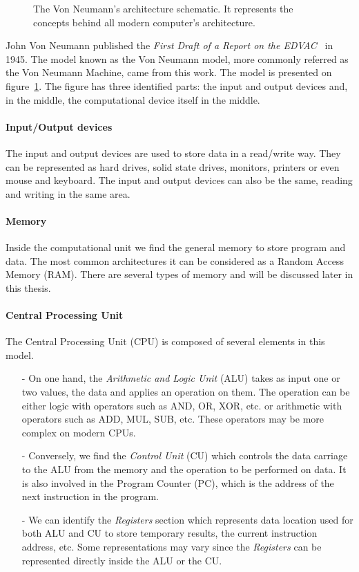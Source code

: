 \begin{figure}
\centering 

\caption[Von Neumann's architecture]{The Von Neumann's architecture schematic. It represents the concepts behind all modern computer's architecture. }
\label{fig:1_HPC:von_neumann_model}
\end{figure}

John Von Neumann published the \textit{First Draft of a Report on the EDVAC}~\cite{von1993first} in 1945. 
The model known as the Von Neumann model, more commonly referred as the Von Neumann Machine, came from this work.
The model is presented on figure~\ref{fig:1_HPC:von_neumann_model}.
The figure has three identified parts: the input and output devices and, in the middle, the computational device itself in the middle. 
\paragraph{Input/Output devices}
The input and output devices are used to store data in a read/write way. 
They can be represented as hard drives, solid state drives, monitors, printers or even mouse and keyboard.
The input and output devices can also be the same, reading and writing in the same area.\\

\paragraph{Memory} 
Inside the computational unit we find the general memory to store program and data. 
The most common architectures it can be considered as a Random Access Memory (RAM). 
There are several types of memory and will be discussed later in this thesis. 

\paragraph{Central Processing Unit}
The Central Processing Unit (CPU) is composed of several elements in this model. 
\begin{itemize}[noitemsep,nolistsep]
\item[-] On one hand, the \textit{Arithmetic and Logic Unit} (ALU) takes as input one or two values, the data and applies an operation on them. 
The operation can be either logic with operators such as AND, OR, XOR, etc. or arithmetic with operators such as ADD, MUL, SUB, etc. 
These operators may be more complex on modern CPUs. 
\item[-] Conversely, we find the \textit{Control Unit} (CU) which controls the data carriage to the ALU from the memory and the operation to be performed on data.
It is also involved in the Program Counter (PC), which is the address of the next instruction in the program. 
\item[-] We can identify the \textit{Registers} section which represents data location used for both ALU and CU to store temporary results, the current instruction address, etc. 
Some representations may vary since the \textit{Registers} can be represented directly inside the ALU or the CU. 
\end{itemize}
